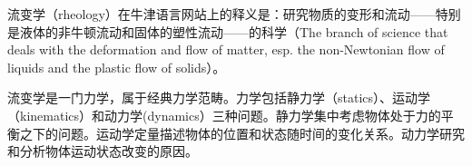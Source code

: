 \documentclass[main.tex]{subfiles}
\begin{document}
流变学（rheology）在牛津语言网站上的释义是：研究物质的变形和流动——特别是液体的非牛顿流动和固体的塑性流动——的科学（The branch of science that deals with the deformation and flow of matter, esp. the non-Newtonian flow of liquids and the plastic flow of solids）。

流变学是一门力学，属于经典力学范畴。力学包括静力学（statics）、运动学（kinematics）和动力学(dynamics）三种问题。静力学集中考虑物体处于力的平衡之下的问题。运动学定量描述物体的位置和状态随时间的变化关系。动力学研究和分析物体运动状态改变的原因。\cite[p.~1]{邓文基2009大物上}
\end{document}
